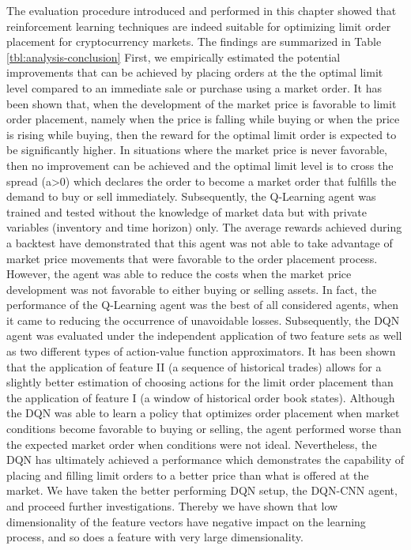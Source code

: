 The evaluation procedure introduced and performed in this chapter showed that reinforcement learning techniques are indeed suitable for optimizing limit order placement for cryptocurrency markets.
The findings are summarized in Table \ref{tbl:analysis-conclusion}
First, we empirically estimated the potential improvements that can be achieved by placing orders at the the optimal limit level compared to an immediate sale or purchase using a market order.
It has been shown that, when the development of the market price is favorable to limit order placement, namely when the price is falling while buying or when the price is rising while buying, then the reward for the optimal limit order is expected to be significantly higher.
In situations where the market price is never favorable, then no improvement can be achieved and the optimal limit level is to cross the spread (a>0) which declares the order to become a market order that fulfills the demand to buy or sell immediately.
Subsequently, the Q-Learning agent was trained and tested without the knowledge of market data but with private variables (inventory and time horizon) only.
The average rewards achieved during a backtest have demonstrated that this agent was not able to take advantage of market price movements that were favorable to the order placement process.
However, the agent was able to reduce the costs when the market price development was  not favorable to either buying or selling assets.
In fact, the performance of the Q-Learning agent was the best of all considered agents, when it came to reducing the occurrence of unavoidable losses.
Subsequently, the DQN agent was evaluated under the independent application of two feature sets as well as two different types of action-value function approximators.
It has been shown that the application of feature II (a sequence of historical trades) allows for a slightly better estimation of choosing actions for the limit order placement than the application of feature I (a window of historical order book states).
Although the DQN was able to learn a policy that optimizes order placement when market conditions become favorable to buying or selling, the agent performed worse than the expected market order when conditions were not ideal.
Nevertheless, the DQN has ultimately achieved a performance which demonstrates the capability of placing and filling limit orders to a better price than what is offered at the market.
We have taken the better performing DQN setup, the DQN-CNN agent, and proceed further investigations.
Thereby we have shown that low dimensionality of the feature vectors have negative impact on the learning process, and so does a feature with very large dimensionality.

